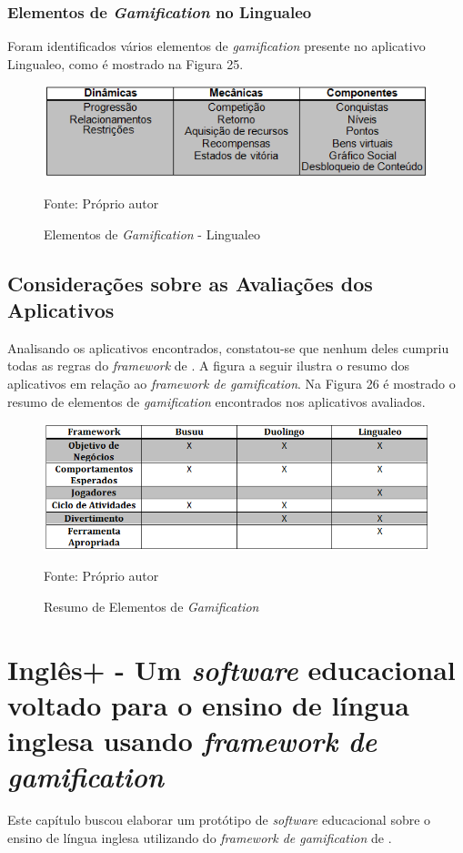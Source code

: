 \documentclass[
	12pt,				%
	openany,			%
	oneside,			%
	a4paper,			%
	english,			%
	french,				%
	spanish,			%
	brazil				%
	]{abntex2}
\begin{document}
\subsection{Elementos de \textit{Gamification} no Lingualeo}

	Foram identificados vários elementos de \textit{gamification} presente no aplicativo Lingualeo, como é mostrado na Figura 25.

\begin{figure}[H]
    \centering
\caption{Elementos de \textit{Gamification} - Lingualeo}
\includegraphics[width=12cm]{figuras/elementoslingualeo.png}
\par
 Fonte: Próprio autor
\end{figure}

\section{Considerações sobre as Avaliações dos Aplicativos}
Analisando os aplicativos encontrados, constatou-se que nenhum deles cumpriu todas as regras do \textit{framework} de . A figura a seguir ilustra o resumo dos aplicativos em relação ao \textit{framework de gamification}. Na Figura 26 é mostrado o resumo de elementos de \textit{gamification} encontrados nos aplicativos avaliados.
\begin{figure}[H]
    \centering
\caption{Resumo de Elementos de \textit{Gamification}}
\includegraphics[width=12cm]{figuras/resumo-apps.png}
\par
 Fonte: Próprio autor
\end{figure}


\chapter{Inglês+ - Um \textit{software} educacional voltado para o ensino de língua inglesa usando \textit{framework de gamification}}
Este capítulo buscou elaborar um protótipo de \textit{software} educacional sobre o ensino de língua inglesa utilizando do \textit{framework de gamification} de .
\end{document}

